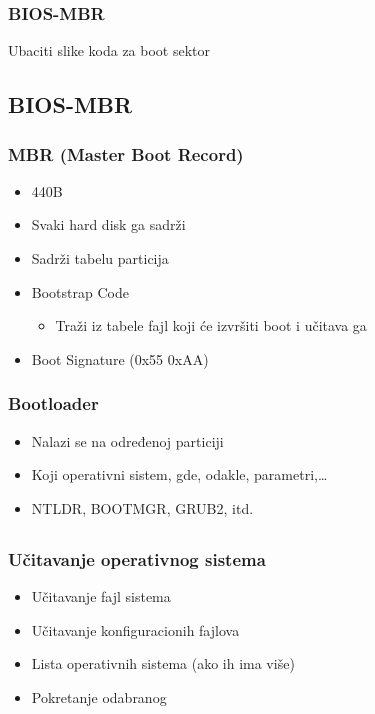 \documentclass{beamer}
\begin{document}
\begin{frame}
    \frametitle{BIOS-MBR}
    Ubaciti slike koda za boot sektor
\end{frame}

\subsection*{BIOS-MBR}
\begin{frame}
    \frametitle{MBR (Master Boot Record)}
    \begin{itemize}
        \item 440B \newline
        \item Svaki hard disk ga sadrži \newline
        \item Sadrži tabelu particija \newline
        \item Bootstrap Code
        \begin{itemize}
            \item Traži iz tabele fajl koji će izvršiti boot i učitava ga \newline
        \end{itemize} 
        \item Boot Signature (0x55 0xAA)
    \end{itemize}
\end{frame}

\begin{frame}
    \frametitle{Bootloader}
    \begin{itemize}
        \item Nalazi se na određenoj particiji \newline
        \item Koji operativni sistem, gde, odakle, parametri,\dots \newline
        \item NTLDR, BOOTMGR, GRUB2, itd.
    \end{itemize}
\end{frame}
\subsection*{}
\begin{frame}
    \frametitle{Učitavanje operativnog sistema}
    \begin{itemize}
        \item Učitavanje fajl sistema \newline
        \item Učitavanje konfiguracionih fajlova \newline
        \item Lista operativnih sistema (ako ih ima više) \newline
        \item Pokretanje odabranog
    \end{itemize}
\end{frame}
\end{document}
